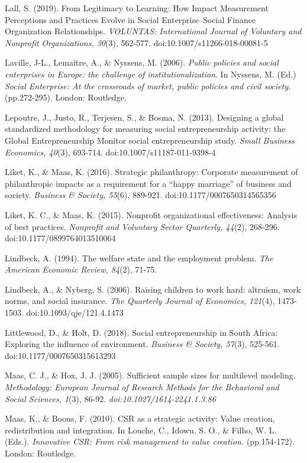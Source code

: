 \documentclass{article}
\begin{document}
Lall, S. (2019). From Legitimacy to Learning: How Impact Measurement Perceptions and Practices Evolve in Social Enterprise--Social Finance Organization Relationships. \emph{VOLUNTAS: International Journal of Voluntary and }\emph{Nonprofit}\emph{ Organizations, 30}(3), 562-577. doi:10.1007/s11266-018-00081-5

Laville, J-L., Lemaître, A., \& Nyssens, M. (2006). \emph{Public policies and social enterprises in Europe: the challenge of institutionalization}. In Nyssens, M. (Ed.) \emph{Social Enterprise: At the crossroads of market, public policies and civil society}. (pp.272-295). London: Routledge.

Lepoutre, J., Justo, R., Terjesen, S., \& Bosma, N. (2013). Designing a global standardized methodology for measuring social entrepreneurship activity: the Global Entrepreneurship Monitor social entrepreneurship study. \emph{Small Business Economics, 40}(3), 693-714. doi:10.1007/s11187-011-9398-4

Liket, K., \& Maas, K. (2016). Strategic philanthropy: Corporate measurement of philanthropic impacts as a requirement for a “happy marriage” of business and society. \emph{Business \& Society, 55}(6), 889-921. doi:10.1177/0007650314565356

Liket, K. C., \& Maas, K. (2015). Nonprofit organizational effectiveness: Analysis of best practices. \emph{Nonprofit}\emph{ and Voluntary Sector Quarterly, 44}(2), 268-296. doi:10.1177/0899764013510064

Lindbeck, A. (1994). The welfare state and the employment problem. \emph{The American Economic Review, 84}(2), 71-75. 

Lindbeck, A., \& Nyberg, S. (2006). Raising children to work hard: altruism, work norms, and social insurance. \emph{The Quarterly Journal of Economics, 121}(4), 1473-1503. doi:10.1093/qje/121.4.1473

Littlewood, D., \& Holt, D. (2018). Social entrepreneurship in South Africa: Exploring the influence of environment. \emph{Business \& Society, 57}(3), 525-561. doi:10.1177/0007650315613293

Maas, C. J., \& Hox, J. J. (2005). Sufficient sample sizes for multilevel modeling. \emph{Methodology: European Journal of Research Methods for the }\emph{Behavioral}\emph{ and Social Sciences, 1}(3), 86-92. \emph{doi:10.1027/1614-2241.1.3.86}

Maas, K., \& Boons, F. (2010). CSR as a strategic activity: Value creation, redistribution and integration. In Louche, C., Idowu, S. O., \& Filho, W. L. (Eds.). \emph{Innovative CSR: From risk management to value creation. }(pp.154-172). London: Routledge. 
\end{document}
